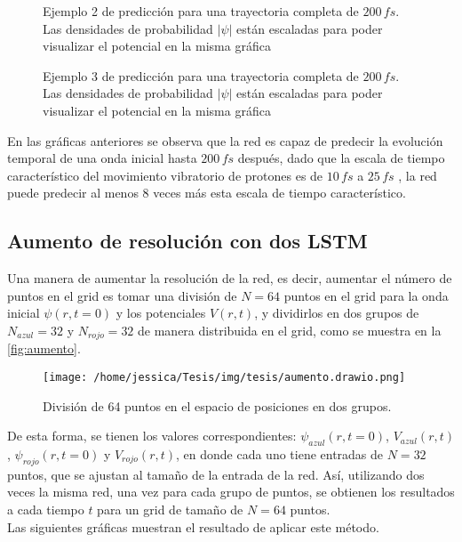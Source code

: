 \begin{figure}[H]
  \centering
  \caption{Ejemplo 2 de predicción para una trayectoria completa de $200\,fs$.\\ Las densidades de probabilidad $|\psi|$ están escaladas para poder visualizar el potencial en la misma gráfica}
  \label{fig:trajec2}
\end{figure}

\begin{figure}[H]
  \centering
  \caption{Ejemplo 3 de predicción para una trayectoria completa de $200\,fs$.\\ Las densidades de probabilidad $|\psi|$ están escaladas para poder visualizar el potencial en la misma gráfica}
  \label{fig:trajec3}
\end{figure}

En las gráficas anteriores se observa que la red es capaz de predecir la evolución temporal de una onda inicial hasta $200\,fs$ después, dado que la escala de tiempo característico del movimiento vibratorio de protones es de $10\,fs$ a $25\,fs$ \cite{Main:2021}, la red puede predecir al menos 8 veces más esta escala de tiempo característico.  


\subsection{Aumento de resolución con dos LSTM}

Una manera de aumentar la resolución de la red, es decir, aumentar el número de puntos en el grid es tomar una división de $N=64$ puntos en el grid para la onda inicial $\psi(r,t=0)$ y los potenciales $V(r,t)$, y dividirlos en dos grupos de $N_{azul}=32$ y $N_{rojo}=32$ de manera distribuida en el grid, como se muestra en la \autoref{fig:aumento}. 

\begin{figure}[H]
  \centering
  \texttt{[image: /home/jessica/Tesis/img/tesis/aumento.drawio.png]}
  \caption{División de 64 puntos en el espacio de posiciones en dos grupos.}
  \label{fig:aumento}
\end{figure}

De esta forma, se tienen los valores correspondientes: $\psi_{azul}(r,t=0)$, $V_{azul}(r,t)$, $\psi_{rojo}(r,t=0)$ y $V_{rojo}(r,t)$, en donde cada uno tiene entradas de $N=32$ puntos, que se ajustan al tamaño de la entrada de la red. Así, utilizando dos veces la misma red, una vez para cada grupo de puntos, se obtienen los resultados a cada tiempo $t$ para un grid de tamaño de $N=64$ puntos.
\\
Las siguientes gráficas muestran el resultado de aplicar este método.

